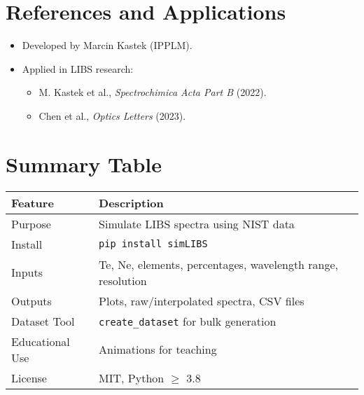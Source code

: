 \documentclass[12pt,a4paper]{article}
\begin{document}
	\section{References and Applications}
	\begin{itemize}
		\item Developed by Marcin Kastek (IPPLM).
		\item Applied in LIBS research:
		\begin{itemize}
			\item M. Kastek et al., \textit{Spectrochimica Acta Part B} (2022).
			\item Chen et al., \textit{Optics Letters} (2023).
		\end{itemize}
	\end{itemize}
	
	\section{Summary Table}
	\begin{center}
		\begin{tabular}{@{}ll@{}}
			\toprule
			\textbf{Feature} & \textbf{Description} \\
			\midrule
			Purpose & Simulate LIBS spectra using NIST data \\
			Install & \verb|pip install simLIBS| \\
			Inputs & Te, Ne, elements, percentages, wavelength range, resolution \\
			Outputs & Plots, raw/interpolated spectra, CSV files \\
			Dataset Tool & \verb|create_dataset| for bulk generation \\
			Educational Use & Animations for teaching \\
			License & MIT, Python $\geq$ 3.8 \\
			\bottomrule
		\end{tabular}
	\end{center}
	
\end{document}
